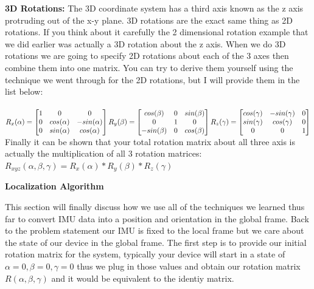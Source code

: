 \documentclass[12pt,letterpaper,boxed]{hmcpset}
\begin{document}
\textbf{3D Rotations:} The 3D coordinate system has a third axis known as the z axis protruding out of the x-y plane. 3D rotations are the exact same thing as 2D rotations. If you think about it carefully the 2 dimensional rotation example that we did earlier was actually a 3D rotation about the z axis. When we do 3D rotations we are going to specify 2D rotations about each of the 3 axes then combine them into one matrix. You can try to derive them yourself using the technique we went through for the 2D rotations, but I will provide them in the list below:\\\\
\begin{math}
	R_x(\alpha) = 
	\begin{bmatrix}
	1&0&0\\
	0&cos(\alpha)&-sin(\alpha)\\
	0&sin(\alpha)&cos(\alpha)
	\end{bmatrix}\\\\
	R_y(\beta) = 
	\begin{bmatrix}
	cos(\beta)&0&sin(\beta)\\
	0&1&0\\
	-sin(\beta)&0&cos(\beta)
	\end{bmatrix}\\\\
	R_z(\gamma) = 
	\begin{bmatrix}
	cos(\gamma)&-sin(\gamma)&0\\
	sin(\gamma)&cos(\gamma)&0\\
	0&0&1
	\end{bmatrix}
\end{math}\\
Finally it can be shown that your total rotation matrix about all three axis is actually the multiplication of all 3 rotation matrices:
\begin{math}
R_{xyz}(\alpha,\beta,\gamma) = R_x(\alpha)*R_y(\beta)*R_z(\gamma)
\end{math}

\begin{center}
\textbf{Localization Algorithm}
\end{center}

This section will finally discuss how we use all of the techniques we learned thus far to convert IMU data into a position and orientation in the global frame. Back to the problem statement our IMU is fixed to the local frame but we care about the state of our device in the global frame. The first step is to provide our initial rotation matrix for the system, typically your device will start in a state of $\alpha = 0, \beta = 0, \gamma = 0$ thus we plug in those values and obtain our rotation matrix $R(\alpha,\beta,\gamma)$ and it would be equivalent to the identiy matrix.
\end{document}
